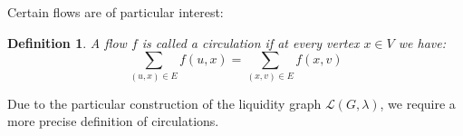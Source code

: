 \documentclass[10pt,twocolumn]{article}
\newtheorem{definition}{Definition}[section]
\newtheorem{lemma}[theorem]{Lemma}
\begin{document}
Certain flows are of particular interest:  

\begin{definition}
A flow \( f \) is called a circulation if at every vertex \( x \in V \) we have:
\begin{equation}
\sum_{(u,x) \in E} f(u,x) = \sum_{(x,v) \in E} f(x,v)
\end{equation}
\end{definition}




Due to the particular construction of the liquidity graph \(\mathcal{L}(G,\lambda)\), we require a more precise definition of circulations.
\end{document}
